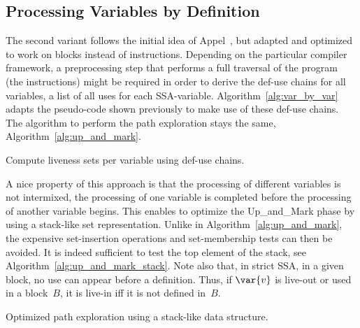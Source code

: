 \subsection{Processing Variables by Definition}
\label{sec:Appel-like}

The second variant follows the initial idea of Appel~\cite[p.~429]{appel:2002:modern}, but adapted and optimized to work on blocks instead of instructions.
Depending on the particular compiler framework, a preprocessing step that performs a full traversal of the program (\ie the instructions) might be required in order to derive the def-use chains for all variables, \ie a list of all uses for each SSA-variable.
Algorithm~\ref{alg:var_by_var} adapts the pseudo-code shown previously to make use of these def-use chains.
The algorithm to perform the path exploration stays the same, \ie Algorithm~\ref{alg:up_and_mark}.

\begin{algorithm}[H]
  \caption{Compute liveness sets per variable using def-use chains.}
  \label{alg:var_by_var}
\end{algorithm}

A nice property of this approach is that the processing of different variables is not intermixed, \ie the processing of one variable is completed before the processing of another variable begins.
This enables to optimize the \textsf{Up\_and\_Mark} phase by using a stack-like set representation.
Unlike in Algorithm~\ref{alg:up_and_mark}, the expensive set-insertion operations and set-membership tests can then be avoided.
It is indeed sufficient to test the top element of the stack, see Algorithm~\ref{alg:up_and_mark_stack}.
Note also that, in strict SSA, in a given block, no use can appear before a definition.
Thus, if $\var{v}$ is live-out or used in a block~$B$, it is live-in iff it is not defined in~$B$.

\begin{algorithm}[H]
  \caption{Optimized path exploration using a stack-like data structure.}
  \label{alg:up_and_mark_stack}
\end{algorithm}

